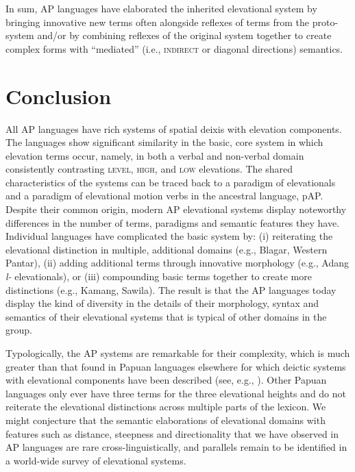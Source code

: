 In sum, AP languages have elaborated the inherited elevational system by bringing innovative new terms often alongside reflexes of terms from the proto-system and/or by combining reflexes of the original system together to create complex forms with ``mediated'' (i.e., \textsc{indirect} or diagonal directions) semantics.

\section{Conclusion}\label{sec:7:5}
All AP languages have rich systems of spatial deixis with elevation components. The languages show significant similarity in the basic, core system in which elevation terms occur, namely, in both a verbal and non-verbal domain consistently contrasting \textsc{level,} \textsc{high,} and \textsc{low} elevations. The shared characteristics of the systems can be traced back to a paradigm of elevationals and a paradigm of elevational motion verbs in the ancestral language, pAP. Despite their common origin, modern AP elevational systems display noteworthy differences in the number of terms, paradigms and semantic features they have. Individual languages have complicated the basic system by: (i) reiterating the elevational distinction in multiple, additional domains (e.g., Blagar, Western Pantar), (ii) adding additional terms through innovative morphology (e.g., Adang \textit{l}\textit{{\textepsilon}}\textit{{}-} elevationals), or (iii) compounding basic terms together to create more distinctions (e.g., Kamang, Sawila). The result is that the AP languages today display the kind of diversity in the details of their morphology, syntax and semantics of their elevational systems that is typical of other domains in the group.

Typologically, the AP systems are remarkable for their complexity, which is much greater than that found in Papuan languages elsewhere for which deictic systems with elevational components have been described (see, e.g., \citealt{Heeschen1982,Heeschen1987}). Other Papuan languages only ever have three terms for the three elevational heights and do not reiterate the elevational distinctions across multiple parts of the lexicon. We might conjecture that the semantic elaborations of elevational domains with features such as distance, steepness and directionality that we have observed in AP languages are rare cross-linguistically, and parallels remain to be identified in a world-wide survey of elevational systems. 

